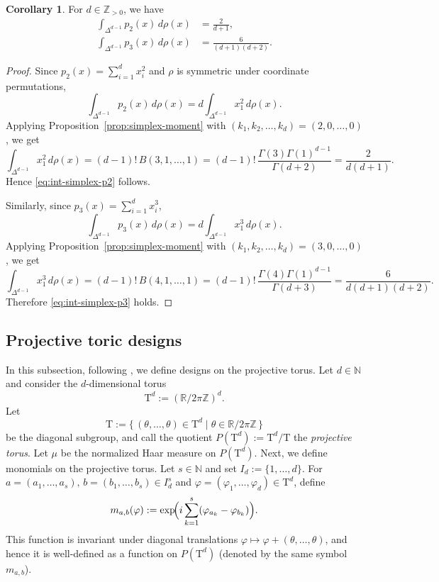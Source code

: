 \documentclass{amsart}
\theoremstyle{definition}
\newtheorem{corollary}[theorem]{Corollary}
\theoremstyle{remark}
\numberwithin{equation}{section}
\newcommand{\T}{{\mathrm T}}
\newcommand{\R}{{\mathbb R}}
\newcommand{\Z}{{\mathbb Z}}
\newcommand{\N}{{\mathbb N}}
\begin{document}
\begin{corollary}\label{cor:simplex-p2p3-moments}
For $d\in\Z_{>0}$, we have
\begin{align}
\int_{\Delta^{d-1}} p_2(x)\,d\rho(x) &= \frac{2}{d+1}, \label{eq:int-simplex-p2}\\
\int_{\Delta^{d-1}} p_3(x)\,d\rho(x) &= \frac{6}{(d+1)(d+2)}. \label{eq:int-simplex-p3}
\end{align}
\end{corollary}

\begin{proof}
Since $p_2(x)=\sum_{i=1}^d x_i^2$ and $\rho$ is symmetric under coordinate permutations,
\[
\int_{\Delta^{d-1}} p_2(x)\,d\rho(x)
= d\int_{\Delta^{d-1}} x_1^2\,d\rho(x).
\]
Applying Proposition~\ref{prop:simplex-moment} with $(k_1,k_2,\dots,k_d)=(2,0,\dots,0)$, we get
\[
\int_{\Delta^{d-1}} x_1^2\,d\rho(x)
=(d-1)!\,B(3,1,\dots,1)
=(d-1)!\,\frac{\Gamma(3)\Gamma(1)^{d-1}}{\Gamma(d+2)}
=\frac{2}{d(d+1)}.
\]
Hence \eqref{eq:int-simplex-p2} follows.

Similarly, since $p_3(x)=\sum_{i=1}^d x_i^3$,
\[
\int_{\Delta^{d-1}} p_3(x)\,d\rho(x)
= d\int_{\Delta^{d-1}} x_1^3\,d\rho(x).
\]
Applying Proposition~\ref{prop:simplex-moment} with $(k_1,k_2,\dots,k_d)=(3,0,\dots,0)$, we get
\[
\int_{\Delta^{d-1}} x_1^3\,d\rho(x)
=(d-1)!\,B(4,1,\dots,1)
=(d-1)!\,\frac{\Gamma(4)\Gamma(1)^{d-1}}{\Gamma(d+3)}
=\frac{6}{d(d+1)(d+2)}.
\]
Therefore \eqref{eq:int-simplex-p3} holds.
\end{proof}


\subsection{Projective toric designs}\label{subsec:projective_toric}

In this subsection, following \cite[Sec.~2, Def.~2.4--2.5]{IMAEG2024},
we define designs on the projective torus.
Let $d\in\N$ and consider the $d$-dimensional torus
\[
\T^d := (\R/2\pi\Z)^d.
\]
Let
\[
\T := \{\,(\theta,\dots,\theta)\in\T^d \mid \theta\in\R/2\pi\Z\,\}
\]
be the diagonal subgroup, and call the quotient
\(
P(\T^d) := \T^d/\T
\)
the \emph{projective torus}.
Let $\mu$ be the normalized Haar  measure on $P(\T^d)$.
Next, we define monomials on the projective torus.
Let $s\in\N$ and set $I_d:=\{1,\dots,d\}$.
For $a=(a_1,\dots,a_s),\,b=(b_1,\dots,b_s)\in I_d^s$ and $\varphi=(\varphi_1,\dots,\varphi_d)\in\T^d$, define
\[
m_{a,b}(\varphi)
:= \exp\!\Bigl(i\sum_{k=1}^{s}(\varphi_{a_k}-\varphi_{b_k})\Bigr).
\]
This function is invariant under diagonal translations $\varphi\mapsto\varphi+(\theta,\dots,\theta)$, and hence it is well-defined as a function on $P(\T^d)$ (denoted by the same symbol $m_{a,b}$).
\end{document}
